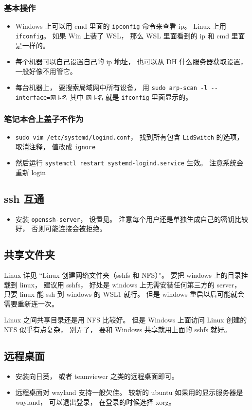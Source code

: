 \subsubsection{基本操作}
\begin{itemize}
\item Windows 上可以用 cmd 里面的 \verb|ipconfig| 命令来查看 ip。 Linux 上用 \verb|ifconfig|。 如果 Win 上装了 WSL， 那么 WSL 里面看到的 ip 和 cmd 里面是一样的。
\item 每个机器可以自己设置自己的 ip 地址， 也可以从 DH 什么服务器获取设置， 一般好像不用管它。
\item 每台机器上， 要搜索局域网中所有设备， 用 \verb|sudo arp-scan -l --interface=网卡名| 其中 \verb|网卡名| 就是 \verb|ifconfig| 里面显示的。
\end{itemize}

\subsubsection{笔记本合上盖子不作为}
\begin{itemize}
\item \verb|sudo vim /etc/systemd/logind.conf|， 找到所有包含 \verb|LidSwitch| 的选项， 取消注释， 值改成 \verb|ignore|
\item 然后运行 \verb|systemctl restart systemd-logind.service| 生效。 注意系统会重新 login
\end{itemize}


\subsection{ssh 互通}
\begin{itemize}
\item 安装 \verb|openssh-server|， 设置见。 注意每个用户还是单独生成自己的密钥比较好， 否则可能连接会被拒绝。
\end{itemize}

\subsection{共享文件夹}
Linux 详见 “Linux 创建网络文件夹（sshfs 和 NFS）”。 要把 windows 上的目录挂载到 linux， 建议用 sshfs， 好处是 windows 上无需安装任何第三方的 server， 只要 linux 能 ssh 到 windows 的 WSL1 就行。 但是 windows 重启以后可能就会需要重新连一次。

Linux 之间共享目录还是用 NFS 比较好。 但是 Windows 上面访问 Linux 创建的 NFS 似乎有点复杂， 别弄了， 要和 Windows 共享就用上面的 sshfs 就好。

\subsection{远程桌面}
\begin{itemize}
\item 安装向日葵， 或者 teamviewer 之类的远程桌面即可。
\item 远程桌面对 wayland 支持一般欠佳。 较新的 ubuntu 如果用的显示服务器是 wayland， 可以退出登录， 在登录的时候选择 xorg。
\end{itemize}
